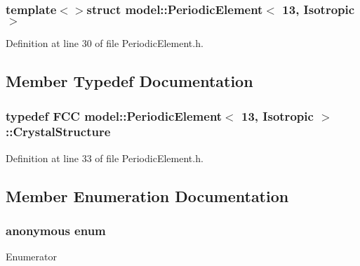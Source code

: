 \subsubsection*{template$<$$>$struct model\+::\+Periodic\+Element$<$ 13, Isotropic $>$}



Definition at line 30 of file Periodic\+Element.\+h.



\subsection{Member Typedef Documentation}
\hypertarget{structmodel_1_1_periodic_element_3_0113_00_01_isotropic_01_4_a7a251de8980c9b68bf122dc027406f5d}{}
\subsubsection[{Crystal\+Structure}]{\setlength{\rightskip}{0pt plus 5cm}typedef {\bf F\+C\+C} {\bf model\+::\+Periodic\+Element}$<$ 13, {\bf Isotropic} $>$\+::{\bf Crystal\+Structure}}\label{structmodel_1_1_periodic_element_3_0113_00_01_isotropic_01_4_a7a251de8980c9b68bf122dc027406f5d}


Definition at line 33 of file Periodic\+Element.\+h.



\subsection{Member Enumeration Documentation}
\hypertarget{structmodel_1_1_periodic_element_3_0113_00_01_isotropic_01_4_a1905eb6e0d995acc788dc9f1bfb39578}{}\subsubsection[{anonymous enum}]{\setlength{\rightskip}{0pt plus 5cm}anonymous enum}\label{structmodel_1_1_periodic_element_3_0113_00_01_isotropic_01_4_a1905eb6e0d995acc788dc9f1bfb39578}
\begin{Desc}
\item[Enumerator]\par
\begin{description}
\item[{\em 
\hypertarget{structmodel_1_1_periodic_element_3_0113_00_01_isotropic_01_4_a1905eb6e0d995acc788dc9f1bfb39578a81d019de2e178d7d546ca5e28c6bcd3b}{}Z\label{structmodel_1_1_periodic_element_3_0113_00_01_isotropic_01_4_a1905eb6e0d995acc788dc9f1bfb39578a81d019de2e178d7d546ca5e28c6bcd3b}
}]\end{description}
\end{Desc}


